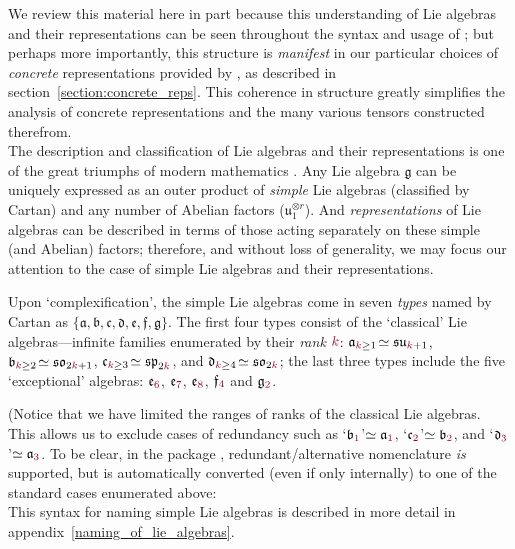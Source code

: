 \documentclass[12pt,a4paper]{article}\let\ifpdf\relax
\begin{document}
We review this material here in part because this understanding of Lie algebras and their representations can be seen throughout the syntax and usage of \rpackage; but perhaps more importantly, this structure is \emph{manifest} in our particular choices of \emph{concrete} representations provided by \rpackage, as described in \mbox{section~\ref{section:concrete_reps}}.  This coherence in structure greatly simplifies the analysis of concrete representations and the many various tensors constructed therefrom.\\[-10pt]


The description and classification of Lie algebras and their representations is one of the great triumphs of modern mathematics \cite{lie1888theorie,lie1893vorlesungen,killing1888zusammensetzung,cartan1894structure,brauer1935spinors,weyl1927quantenmechanik,chevalley1946theory,curtis1999pioneers}. Any Lie algebra $\mathfrak{g}$ can be uniquely expressed as an outer product of \emph{simple} Lie algebras (classified by Cartan) and any number of Abelian factors ($\mathfrak{u}_1^{\otimes r}$). And \emph{representations} of Lie algebras can be described in terms of those acting separately on these simple (and Abelian) factors; therefore, and without loss of generality, we may focus our attention to the case of simple Lie algebras and their representations. 

Upon `complexification', the simple Lie algebras come in seven \emph{types} named by Cartan as $\{\mathfrak{a},\mathfrak{b},\mathfrak{c},\mathfrak{d},\mathfrak{e},\mathfrak{f},\mathfrak{g}\}$. The first four types consist of the `classical' Lie algebras---infinite families enumerated by their \emph{rank} $\r{k}$: $\mathfrak{a}_{\r{k}\geq1}\!\simeq\mathfrak{su}_{\r{k}{+}1}$, $\mathfrak{b}_{\r{k}\geq2}\!\simeq\mathfrak{so}_{2\r{k}{+}1}$, $\mathfrak{c}_{\r{k}\geq3}\!\simeq\mathfrak{sp}_{2\r{k}}$, and $\mathfrak{d}_{\r{k}\geq4}\!\simeq\mathfrak{so}_{2\r{k}}$; the last three types include the five `exceptional' algebras: $\mathfrak{e}_{\r{6}}$, $\mathfrak{e}_{\r{7}}$, $\mathfrak{e}_{\r{8}}$, $\mathfrak{f}_{\r{4}}$ and $\mathfrak{g}_{\r{2}}$. 

(Notice that we have limited the ranges of ranks of the classical Lie algebras. This allows us to exclude cases of redundancy such as `$\mathfrak{b}_{\r{1}}$'$\simeq\mathfrak{a}_{\r{1}}$, `$\mathfrak{c}_{\r{2}}$'$\simeq\mathfrak{b}_{\r{2}}$, and `$\mathfrak{d}_{\r{3}}$'$\simeq\mathfrak{a}_{\r{3}}$. To be clear, in the package \rpackage, redundant/alternative nomenclature \emph{is} supported, but is automatically converted (even if only internally) to one of the standard cases enumerated above:
%
~\\[-1pt]
%
This syntax for naming simple Lie algebras is described in more detail in \mbox{appendix~\ref{naming_of_lie_algebras}}.
\end{document}

